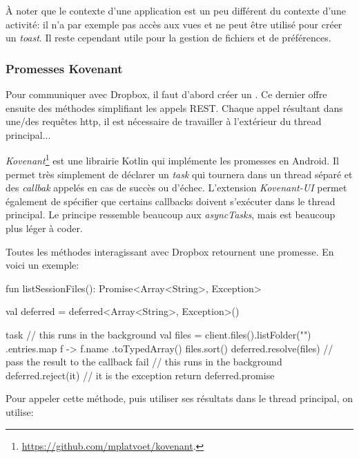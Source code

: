 À noter que le contexte d'une application est un peu différent du contexte d'une activité: il n'a par exemple pas accès aux vues et ne peut être utilisé pour créer un \emph{toast}. Il reste cependant utile pour la gestion de fichiers et de préférences.


\subsubsection*{Promesses Kovenant}

Pour communiquer avec Dropbox, il faut d'abord créer un . Ce dernier offre ensuite des méthodes simplifiant les appels REST. Chaque appel résultant dans une/des requêtes http, il est nécessaire de travailler à l'extérieur du thread principal...

\emph{Kovenant}\footnote{\url{https://github.com/mplatvoet/kovenant}.} est une librairie Kotlin qui implémente les promesses en Android. Il permet très simplement de déclarer un \emph{task} qui tournera dans un thread séparé et des \emph{callbak} appelés en cas de succès ou d'échec. L'extension \emph{Kovenant-UI} permet également de spécifier que certains callbacks doivent s'exécuter dans le thread principal. Le principe ressemble beaucoup aux \emph{asyncTasks}, mais est beaucoup plus léger à coder. 

Toutes les méthodes interagissant avec Dropbox retournent une promesse. En voici un exemple:

\begin{kotlincode}
fun listSessionFiles(): Promise<Array<String>, Exception> {
    val deferred = deferred<Array<String>, Exception>()

    task {
        // this runs in the background
        val files = client.files().listFolder("")
            .entries.map { f -> f.name }.toTypedArray()
        files.sort()
        deferred.resolve(files) // pass the result to the callback
    } fail {
        // this runs in the background
        deferred.reject(it) // it is the exception
    }
    return deferred.promise
}
\end{kotlincode}

Pour appeler cette méthode, puis utiliser ses résultats dans le thread principal, on utilise:


